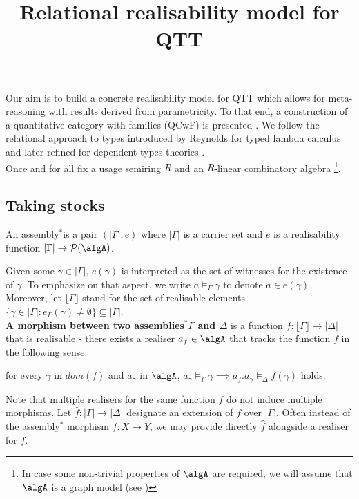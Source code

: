 \documentclass[12pt,a4paper]{article}
\title{\vspace{-5em} Relational realisability model for QTT}
\date{\vspace{-3em}}
\def\Assemblies{Assemblies$^*$\xspace}
\def\assembly{assembly$^*$\xspace}
\def\assemblies{assemblies$^*$\xspace}
\begin{document}
\maketitle

Our aim is to build a concrete realisability model for QTT which allows for meta-reasoning with results derived from parametricity. To that end, a construction of a quantitative category with families (QCwF) is presented \cite{Atkey2018}. We follow the relational approach to types introduced by Reynolds for typed lambda calculus \cite{Ma1992} and later refined for dependent types theories \cite{Atkey2014a}.\\

Once and for all fix a usage semiring $R$ and an $R$-linear combinatory algebra \algA\footnote{In case some non-trivial properties of $\algA$ are required, we will assume that $\algA$ is a graph model (see \cite{Engeler1981})}.

\subsection*{Taking stocks}
\begin{definition}[\Assemblies]
  An \assembly \Gamma is a pair $(|\Gamma|, e)$ where $|\Gamma|$ is a carrier set and  $e$ is a realisability function $|\Gamma| \to \pow(\algA)$.
\end{definition}
Given some $\gamma \in |\Gamma|$, $e(\gamma)$ is interpreted as the set of witnesses for the existence of $\gamma$. To emphasize on that aspect, we write $a \vDash_\Gamma \gamma$ to denote $a \in e(\gamma)$. Moreover, let $\lfloor\Gamma\rfloor$ stand for the set of realisable elements - $\{ \gamma \in |\Gamma| : e_\Gamma(\gamma) \neq \emptyset \} \subseteq |\Gamma|$. \\

\textbf{A morphism between two \assemblies $\Gamma$ and $\Delta$} is a function $f : \lfloor \Gamma \rfloor  \to |\Delta|$ that is realisable - there exists a realiser $a_f \in \algA$ that tracks the function $f$ in the following sense:
\begin{center}
  for every $\gamma$ in $dom(f)$ and $a_\gamma$ in $\algA$,  $a_\gamma \vDash_\Gamma \gamma \implies a_f . a_\gamma \vDash_\Delta f(\gamma)$ holds.
\end{center}

Note that multiple realisers for the same function $f$ do not induce multiple morphisms. Let $\widehat{f} : |\Gamma| \to |\Delta|$ designate an extension of $f$ over $|\Gamma|$. Often instead of the \assembly morphism $f : X \to Y$, we may provide directly $\widehat{f}$ alongside a realiser for $f$.\\
\end{document}
